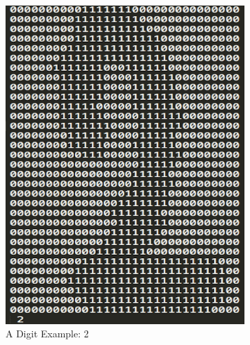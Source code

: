 \documentclass[11pt]{article}
\begin{document}
\begin{figure}[htbp]
\centering

\begin{subfigure}[htbp]{0.32\columnwidth}
\includegraphics*[width=\textwidth]{fig/ex_digit}
\caption{A Digit Example: 2}
\label{fig:ex:digit}
\end{subfigure}
\hfill
\begin{subfigure}[htbp]{0.32\columnwidth}

\end{subfigure}
\end{figure}
\end{document}
